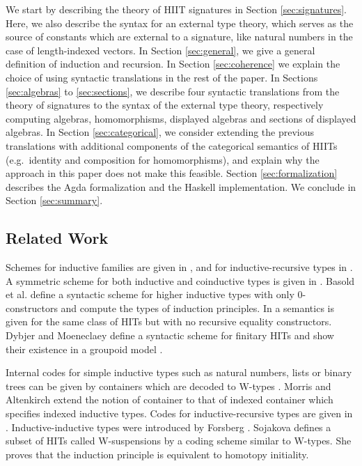 \documentclass[dvipsnames]{lmcs} %
\newcommand{\1}{\mathsf{1}} \renewcommand{\Pr}{\mathsf{Pr}}
\theoremstyle{plain}\newtheorem{satz}[thm]{Satz} %
\begin{document}
We start by describing the theory of HIIT signatures in Section
\ref{sec:signatures}. Here, we also describe the syntax for an external type
theory, which serves as the source of constants which are external to a
signature, like natural numbers in the case of length-indexed vectors. In
Section \ref{sec:general}, we give a general definition of induction and
recursion. In Section \ref{sec:coherence} we explain the choice of using
syntactic translations in the rest of the paper. In Sections \ref{sec:algebras}
to \ref{sec:sections}, we describe four syntactic translations from the theory
of signatures to the syntax of the external type theory, respectively computing
algebras, homomorphisms, displayed algebras and sections of displayed
algebras. In Section \ref{sec:categorical}, we consider extending the previous
translations with additional components of the categorical semantics of HIITs
(e.g.\ identity and composition for homomorphisms), and explain why the approach
in this paper does not make this feasible. Section \ref{sec:formalization}
describes the Agda formalization and the Haskell implementation. We conclude in
Section \ref{sec:summary}.

\subsection{Related Work}

Schemes for inductive families are given in
\cite{Dybjer97inductivefamilies,paulinmohring}, and for inductive-recursive
types in \cite{dybjer00ir}. A symmetric scheme for both inductive and
coinductive types is given in \cite{henning}. Basold et al. \cite{niels} define
a syntactic scheme for higher inductive types with only 0-constructors and
compute the types of induction principles. In \cite{nielsmsc} a semantics is
given for the same class of HITs but with no recursive equality
constructors. Dybjer and Moeneclaey define a syntactic scheme for finitary HITs
and show their existence in a groupoid model \cite{moeneclaey}.

Internal codes for simple inductive types such as natural numbers, lists or
binary trees can be given by containers which are decoded to W-types
\cite{abbot05containers}. Morris and Altenkirch \cite{morris09indexed} extend
the notion of container to that of indexed container which specifies indexed
inductive types. Codes for inductive-recursive types are given in
\cite{Dybjer99afinite}. Inductive-inductive types were introduced by Forsberg
\cite{forsberg-phd}. Sojakova \cite{sojakova} defines a subset of HITs called
W-suspensions by a coding scheme similar to W-types. She proves that the
induction principle is equivalent to homotopy initiality.
\end{document}
